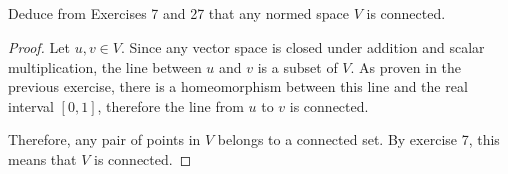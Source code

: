 \subsection{} Deduce from Exercises 7 and 27 that any normed space $V$ is connected.

\begin{proof}
Let $u,v \in V$. Since any vector space is closed under addition and scalar multiplication, the line between $u$ and $v$ is a subset of $V$. As proven in the previous exercise, there is a homeomorphism between this line and the real interval $[0,1]$, therefore the line from $u$ to $v$ is connected.

Therefore, any pair of points in $V$ belongs to a connected set. By exercise 7, this means that $V$ is connected.
\end{proof}

\newpage

